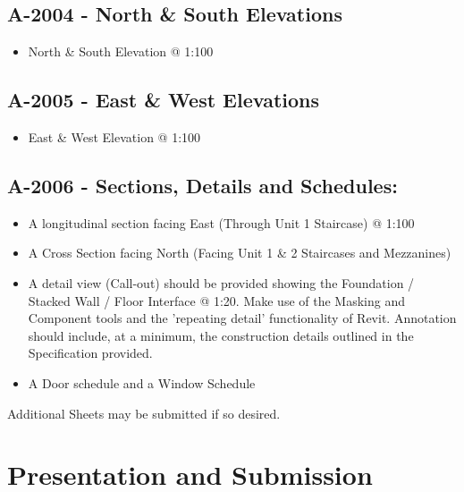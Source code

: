 \subsection*{A-2004 - North \& South Elevations}
\begin{itemize}
	\item North \& South Elevation @ 1:100
\end{itemize}

\subsection*{A-2005 - East \& West Elevations}
\begin{itemize}
	\item East \& West Elevation @ 1:100
\end{itemize}

\subsection*{A-2006 - Sections, Details and Schedules:}
\begin{itemize}
	\item A longitudinal section facing East (Through Unit 1 Staircase) @ 1:100
	\item A Cross Section facing North (Facing Unit 1 \& 2 Staircases and Mezzanines)
	\item A detail view (Call-out) should be provided showing the Foundation / Stacked Wall / Floor Interface @ 1:20.  Make use of the Masking and Component tools and the 'repeating detail' functionality of Revit.  Annotation should include, at a minimum, the construction details outlined in the Specification provided.
	\item A Door schedule and a Window Schedule
\end{itemize}

Additional Sheets may be submitted if so desired.




\newpage
\section*{Presentation and Submission}

